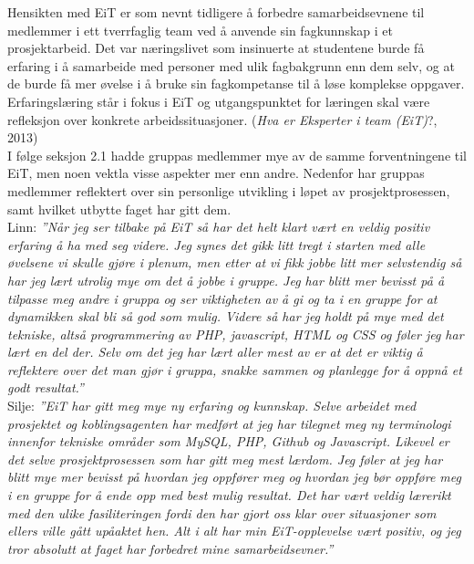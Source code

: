 Hensikten med EiT er som nevnt tidligere å forbedre samarbeidsevnene til medlemmer i ett tverrfaglig team ved å anvende sin fagkunnskap i et prosjektarbeid. Det var næringslivet som insinuerte at studentene burde få erfaring i å samarbeide med personer med ulik fagbakgrunn enn dem selv, og at de burde få mer øvelse i å bruke sin fagkompetanse til å løse komplekse oppgaver. Erfaringslæring står i fokus i EiT og utgangspunktet for læringen skal være refleksjon over konkrete arbeidssituasjoner. (\textit{Hva er Eksperter i team (EiT)}?, 2013)\\

I følge seksjon 2.1 hadde gruppas medlemmer mye av de samme forventningene til EiT, men noen vektla visse aspekter mer enn andre. Nedenfor har gruppas medlemmer reflektert over sin personlige utvikling i løpet av prosjektprosessen, samt hvilket utbytte faget har gitt dem.\\

Linn: \textit{''Når jeg ser tilbake på EiT så har det helt klart vært en veldig positiv erfaring å ha med seg videre. Jeg synes det gikk litt tregt i starten med alle øvelsene vi skulle gjøre i plenum, men etter at vi fikk jobbe litt mer selvstendig så har jeg lært utrolig mye om det å jobbe i gruppe. Jeg har blitt mer bevisst på å tilpasse meg andre i gruppa og ser viktigheten av å gi og ta i en gruppe for at dynamikken skal bli så god som mulig. Videre så har jeg holdt på mye med det tekniske, altså programmering av PHP, javascript, HTML og CSS og føler jeg har lært en del der. Selv om det jeg har lært aller mest av er at det er viktig å reflektere over det man gjør i gruppa, snakke sammen og planlegge for å oppnå et godt resultat.''}\\

Silje: \textit{''EiT har gitt meg mye ny erfaring og kunnskap. Selve arbeidet med prosjektet og koblingsagenten har medført at jeg har tilegnet meg ny terminologi innenfor tekniske områder som MySQL, PHP, Github og Javascript. Likevel er det selve prosjektprosessen som har gitt meg mest lærdom. Jeg føler at jeg har blitt mye mer bevisst på hvordan jeg oppfører meg og hvordan jeg bør oppføre meg i en gruppe for å ende opp med best mulig resultat. Det har vært veldig lærerikt med den ulike fasiliteringen fordi den har gjort oss klar over situasjoner som ellers ville gått upåaktet hen. Alt i alt har min EiT-opplevelse vært positiv, og jeg tror absolutt at faget har forbedret mine samarbeidsevner.''}\\

